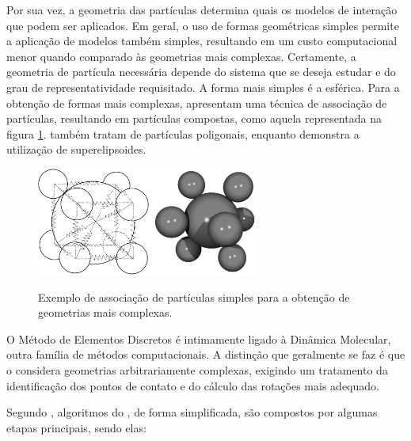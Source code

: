 Por sua vez, a geometria das partículas determina quais os modelos de interação que podem ser aplicados. Em geral, o uso de formas geométricas simples permite a aplicação de modelos também simples, resultando em um custo computacional menor quando comparado às geometrias mais complexas. Certamente, a geometria de partícula necessária depende do sistema que se deseja estudar e do grau de representatividade requisitado. A forma mais simples é a esférica. Para a obtenção de formas mais complexas,  apresentam uma técnica de associação de partículas, resultando em partículas compostas, como aquela representada na figura \ref{fig:composite_particle}.  também tratam de partículas poligonais, enquanto  demonstra a utilização de superelipsoides.

\begin{figure}[h]
	\caption{Exemplo de associação de partículas simples para a obtenção de geometrias mais complexas.}
	\centering
		\includegraphics[width=0.65\textwidth]{images/introduction/composite_particle.png}
	\label{fig:composite_particle}
\end{figure}

O Método de Elementos Discretos é intimamente ligado à Dinâmica Molecular, outra família de métodos computacionais. A distinção que geralmente se faz é que o \DEM{} considera geometrias arbitrariamente complexas, exigindo um tratamento da identificação dos pontos de contato e do cálculo das rotações mais adequado.

Segundo , algoritmos do \DEM{}, de forma simplificada, são compostos por algumas etapas principais, sendo elas:

